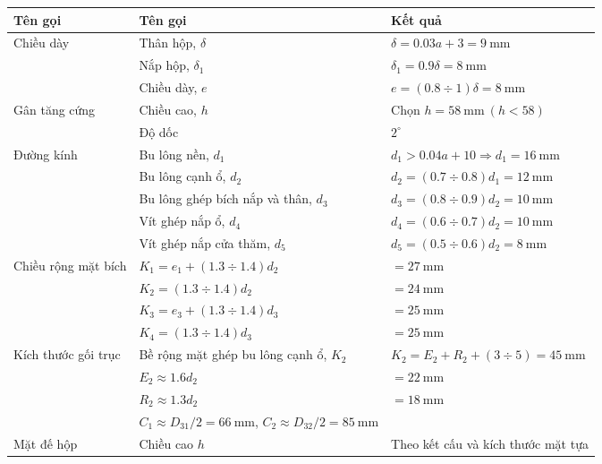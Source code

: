 \begin{table}[H]
\centering
\renewcommand{\arraystretch}{1.4}
\begin{tabular}{|l|l|l|}
\hline
\textbf{Tên gọi} & \textbf{Tên gọi} & \textbf{Kết quả} \\ \hline
\multirow{3}{*}{Chiều dày} 
    & Thân hộp, $\delta$ & $\delta = 0.03a + 3 = 9\ \text{mm}$ \\ \cline{2-3}
    & Nắp hộp, $\delta_1$ & $\delta_1 = 0.9\delta = 8\ \text{mm}$ \\ \cline{2-3}
    & Chiều dày, $e$ & $e = (0.8 \div 1)\delta = 8\ \text{mm}$ \\ \hline
\multirow{2}{*}{Gân tăng cứng} 
    & Chiều cao, $h$ & Chọn $h = 58\ \text{mm} \ (h < 58)$ \\ \cline{2-3}
    & Độ dốc & $2^\circ$ \\ \hline
\multirow{5}{*}{Đường kính} 
    & Bu lông nền, $d_1$ & $d_1 > 0.04a + 10 \Rightarrow d_1 = 16\ \text{mm}$ \\ \cline{2-3}
    & Bu lông cạnh ổ, $d_2$ & $d_2 = (0.7 \div 0.8)d_1 = 12\ \text{mm}$ \\ \cline{2-3}
    & Bu lông ghép bích nắp và thân, $d_3$ & $d_3 = (0.8 \div 0.9)d_2 = 10\ \text{mm}$ \\ \cline{2-3}
    & Vít ghép nắp ổ, $d_4$ & $d_4 = (0.6 \div 0.7)d_2 = 10\ \text{mm}$ \\ \cline{2-3}
    & Vít ghép nắp cửa thăm, $d_5$ & $d_5 = (0.5 \div 0.6)d_2 = 8\ \text{mm}$ \\ \hline
\multirow{4}{*}{Chiều rộng mặt bích} 
    & $K_1 = e_1 + (1.3 \div 1.4)d_2$ & $= 27\ \text{mm}$ \\ \cline{2-3}
    & $K_2 = (1.3 \div 1.4)d_2$ & $= 24\ \text{mm}$ \\ \cline{2-3}
    & $K_3 = e_3 + (1.3 \div 1.4)d_3$ & $= 25\ \text{mm}$ \\ \cline{2-3}
    & $K_4 = (1.3 \div 1.4)d_3$ & $= 25\ \text{mm}$ \\ \hline
    \multirow{4}{*}{Kích thước gối trục} 
    & Bề rộng mặt ghép bu lông cạnh ổ, $K_2$ & $K_2 = E_2 + R_2 + (3 \div 5) = 45\ \text{mm}$ \\ \cline{2-3}
    & $E_2 \approx 1.6d_2$ & $= 22\ \text{mm}$ \\ \cline{2-3}
    & $R_2 \approx 1.3d_2$ & $= 18\ \text{mm}$ \\ \cline{2-3}
    & $C_1 \approx D_{31}/2 = 66\ \text{mm}$, $C_2 \approx D_{32}/2 = 85\ \text{mm}$ & \\ \hline
Mặt đế hộp & Chiều cao $h$ & Theo kết cấu và kích thước mặt tựa \\ \hline

\end{tabular}
\end{table}
